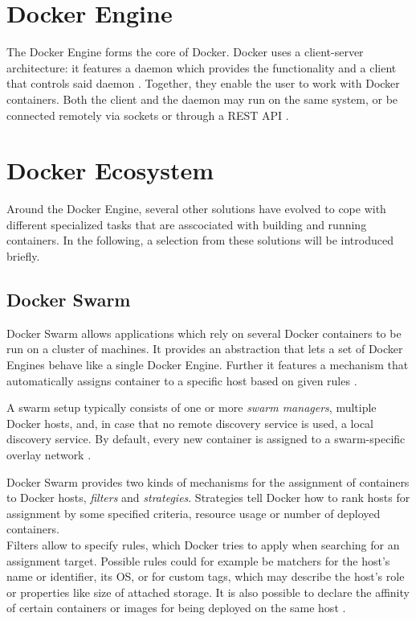 

\section{Docker Engine} %
\label{sec:docker_engine}

 The Docker Engine forms the core of Docker.
 Docker uses a client-server architecture: it features a daemon which provides the functionality and a client that controls said daemon \cite{Docker????DockerCom}. Together, they enable the user to work with Docker containers. Both the client and the daemon may run on the same system, or be connected remotely via sockets or through a \ac{REST} \ac{API} \cite{Docker????Dockera}.


\section{Docker Ecosystem} %
\label{sec:docker_ecosystem}

  Around the Docker Engine, several other solutions have evolved to cope with different specialized tasks that are asscociated with building and running containers. In the following, a selection from these solutions will be introduced briefly.

  \subsection{Docker Swarm} %
  \label{sub:docker_swarm}
    Docker Swarm allows applications which rely on several Docker containers to be run on a cluster of machines. It provides an abstraction that lets a set of Docker Engines behave like a single Docker Engine. Further it features a mechanism that automatically assigns container to a specific host based on given rules \cite{Docker????Dockerb}.

    A swarm setup typically consists of one or more \emph{swarm managers}, multiple Docker hosts, and, in case that no remote discovery service is used, a local discovery service. By default, every new container is assigned to a swarm-specific overlay network \cite{Docker????Dockera}.

    Docker Swarm provides two kinds of mechanisms for the assignment of containers to Docker hosts, \emph{filters} and \emph{strategies}. Strategies tell Docker how to rank hosts for assignment by some specified criteria, \eg resource usage or number of deployed containers. \\
    Filters allow to specify rules, which Docker tries to apply when searching for an assignment target. Possible rules could for example be matchers for the host's name or identifier, its \ac{OS}, or for custom tags, which may describe the host's role or properties like size of attached storage. It is also possible to declare the affinity of certain containers or images for being deployed on the same host \cite{Docker????Dockera}.

